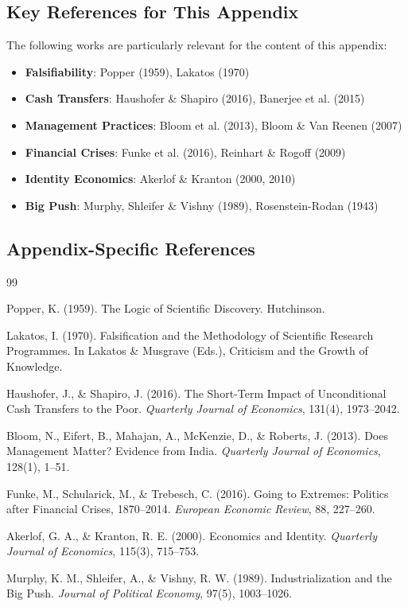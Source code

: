 \subsection{Key References for This Appendix}

The following works are particularly relevant for the content of this appendix:

\begin{itemize}[nosep]
    \item \textbf{Falsifiability}: Popper (1959), Lakatos (1970)
    \item \textbf{Cash Transfers}: Haushofer \& Shapiro (2016), Banerjee et al. (2015)
    \item \textbf{Management Practices}: Bloom et al. (2013), Bloom \& Van Reenen (2007)
    \item \textbf{Financial Crises}: Funke et al. (2016), Reinhart \& Rogoff (2009)
    \item \textbf{Identity Economics}: Akerlof \& Kranton (2000, 2010)
    \item \textbf{Big Push}: Murphy, Shleifer \& Vishny (1989), Rosenstein-Rodan (1943)
\end{itemize}

\subsection{Appendix-Specific References}

\begin{thebibliography}{99}

 Popper, K. (1959). The Logic of Scientific Discovery. Hutchinson.

 Lakatos, I. (1970). Falsification and the Methodology of Scientific Research Programmes. In Lakatos \& Musgrave (Eds.), Criticism and the Growth of Knowledge.

 Haushofer, J., \& Shapiro, J. (2016). The Short-Term Impact of Unconditional Cash Transfers to the Poor. \textit{Quarterly Journal of Economics}, 131(4), 1973--2042.

 Bloom, N., Eifert, B., Mahajan, A., McKenzie, D., \& Roberts, J. (2013). Does Management Matter? Evidence from India. \textit{Quarterly Journal of Economics}, 128(1), 1--51.

 Funke, M., Schularick, M., \& Trebesch, C. (2016). Going to Extremes: Politics after Financial Crises, 1870--2014. \textit{European Economic Review}, 88, 227--260.

 Akerlof, G. A., \& Kranton, R. E. (2000). Economics and Identity. \textit{Quarterly Journal of Economics}, 115(3), 715--753.

 Murphy, K. M., Shleifer, A., \& Vishny, R. W. (1989). Industrialization and the Big Push. \textit{Journal of Political Economy}, 97(5), 1003--1026.

\end{thebibliography}


